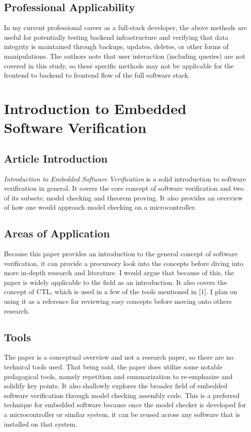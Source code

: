 \documentclass[conference]{IEEEtran}
\begin{document}
\subsection{Professional Applicability}
In my current professional career as a full-stack developer, the above methods are useful for potentially testing backend infrastructure and verifying that data integrity is maintained through backups, updates, deletes, or other forms of manipulations. The authors note that user interaction (including queries) are not covered in this study, so these specific methods may not be applicable for the frontend to backend to frontend flow of the full software stack.

\section{Introduction to Embedded Software Verification}

\subsection{Article Introduction}
\emph{Introduction to Embedded Software Verification} is a solid introduction to software verification in general. It covers the core concept of software verification and two of its subsets; model checking and theorem proving. It also provides an overview of how one would approach model checking on a microcontroller.

\subsection{Areas of Application}
Because this paper provides an introduction to the general concept of software verification, it can provide a precursory look into the concepts before diving into more in-depth research and literature. I would argue that because of this, the paper is widely applicable to the field as an introduction. It also covers the concept of CTL, which is used in a few of the tools mentioned in [1]. I plan on using it as a reference for reviewing easy concepts before moving onto others research. 

\subsection{Tools}
The paper is a conceptual overview and not a research paper, so there are no technical tools used. That being said, the paper does utilize some notable pedagogical tools, namely repetition and summarization to re-emphasize and solidify key points. It also shallowly explores the broader field of embedded software verification through model checking assembly code. This is a preferred technique for embedded software because once the model checker is developed for a microcontroller or similar system, it can be reused across any software that is installed on that system.
\end{document}
